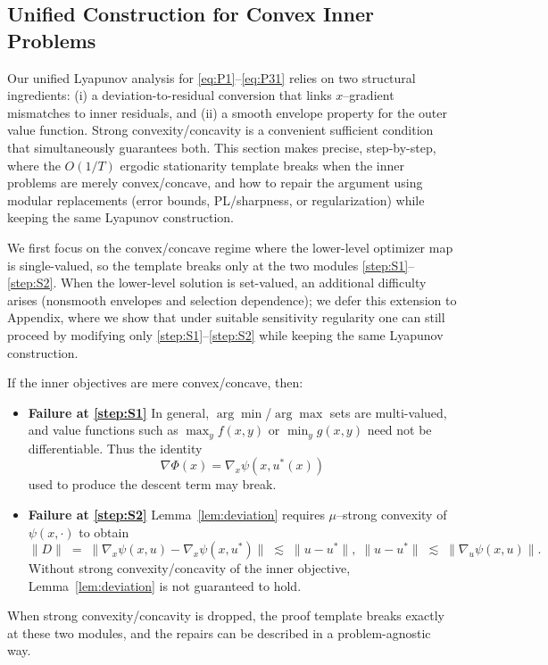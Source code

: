 \documentclass{article}
\newcommand{\1}{\mathbf{1}}
\begin{document}

\subsection{Unified Construction for Convex Inner Problems}\label{sec:mere}
Our unified Lyapunov analysis for \ref{eq:P1}--\ref{eq:P31} relies on two structural ingredients:
(i) a deviation-to-residual conversion that links $x$--gradient mismatches to inner residuals,
and (ii) a smooth envelope property for the outer value function.
Strong convexity/concavity is a convenient sufficient condition that simultaneously guarantees both. This section makes precise, step-by-step, where the $O(1/T)$ ergodic stationarity template breaks when the inner problems are merely convex/concave, and how to repair the argument using modular replacements (error bounds, PL/sharpness, or regularization) while keeping the same Lyapunov construction. 

We first focus on the convex/concave regime where the lower-level optimizer map is single-valued,
so the template breaks only at the two modules \ref{step:S1}--\ref{step:S2}.
When the lower-level solution is set-valued, an additional difficulty arises (nonsmooth envelopes and selection dependence);
we defer this extension to Appendix,
where we show that under suitable sensitivity regularity one can still proceed by
modifying only \ref{step:S1}--\ref{step:S2} while keeping the same Lyapunov construction.

If the inner objectives are mere convex/concave, then:
\begin{itemize}[leftmargin=*]
\item \textbf{Failure at \ref{step:S1}} 
In general, $\arg\min$/$\arg\max$ sets are multi-valued, and value functions such as
$\max_y f(x,y)$ or $\min_y g(x,y)$ need not be differentiable.
Thus the identity 
\begin{equation}\label{eq:envelope}
\nabla\Phi(x)=\nabla_x\psi(x,u^*(x)) 
\end{equation}
used to produce the descent term may break.

\item \textbf{Failure at \ref{step:S2}}
Lemma~\ref{lem:deviation} requires $\mu$--strong convexity of $\psi(x,\cdot)$ to obtain
\[
\|D\|
\;=\;
\|\nabla_x\psi(x,u)-\nabla_x\psi(x,u^*)\|
\;\lesssim\;
\|u-u^*\|,\;
\|u-u^*\|
\;\lesssim\;
\|\nabla_u\psi(x,u)\|.
\]
Without strong convexity/concavity of the inner objective, Lemma~\ref{lem:deviation} is not guaranteed to hold.
\end{itemize}
When strong convexity/concavity is dropped, the proof template breaks exactly at these two modules, and the repairs can be described in a problem-agnostic way.
\end{document}
